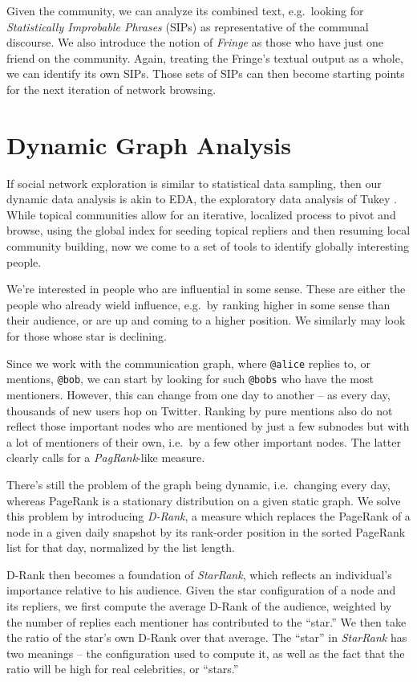 \documentclass[10pt,oneside]{memoir}
\begin{document}
\begin{Spacing}{2}
Given the community, we can analyze its combined text, e.g.\ looking for {\itshape Statistically Improbable Phrases} (SIPs) as representative of the communal discourse.  We also introduce the notion of {\itshape Fringe} as those who have just one friend on the community.  Again, treating the Fringe's textual output as a whole, we can identify its own SIPs.  Those sets of SIPs can then become starting points for the next iteration of network browsing.


\pagebreak \section{Dynamic Graph Analysis}
\label{dynamicgraphanalysis}

If social network exploration is similar to statistical data sampling, then our dynamic data analysis is akin to   EDA, the exploratory data analysis of Tukey \cite{Tukey:1977:EDA}.  While topical communities allow for an iterative, localized process to pivot and browse, using the global index for seeding topical repliers and then resuming local community building, now we come to a set of tools to identify globally interesting people.


We're interested in people who are influential in some sense.  These are either the people who already wield influence, e.g.\ by ranking higher in some sense than their audience, or are up and coming to a higher position.  We similarly may look for those whose star is declining.


Since we work with the communication graph, where \texttt{@alice} replies to, or mentions, \texttt{@bob}, we can start by looking for such \texttt{@bobs} who have the most mentioners.  However, this can change from one day to another -- as every day, thousands of new users hop on Twitter.  Ranking by pure mentions also do not reflect those important nodes who are mentioned by just a few subnodes but with a lot of mentioners of their own, i.e.\ by a few other important nodes.  The latter clearly calls for a {\itshape PagRank}-like measure.  


There's still the problem of the graph being dynamic, i.e.\ changing every day, whereas PageRank is a stationary distribution on a given static graph.  We solve this problem by introducing {\itshape D-Rank}, a measure which replaces the PageRank of a node in a given daily snapshot by its rank-order position in the sorted PageRank list for that day, normalized by the list length.


D-Rank then becomes a foundation of {\itshape StarRank}, which reflects an individual's importance relative to his audience.  Given the star configuration of a node and its repliers, we first compute the average D-Rank of the audience, weighted by the number of replies each mentioner has contributed to the ``star.''  We then take the ratio of the star's own D-Rank over that average.  The ``star'' in {\itshape StarRank} has two meanings -- the configuration used to compute it, as well as the fact that the ratio will be high for real celebrities, or ``stars.''  



\end{Spacing}
\end{document}

